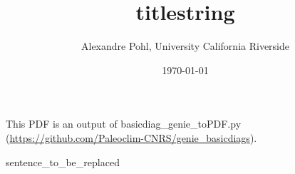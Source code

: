 \documentclass[a4paper,12pt]{scrartcl}
\begin{document}
\title{titlestring}
\author{Alexandre Pohl, University California Riverside}
\date{\today}
\maketitle

\listoffigures

\clearpage

This PDF is an output of basicdiag_genie_toPDF.py (\url{https://github.com/Paleoclim-CNRS/genie_basicdiags}). \\ 



\begin{flushleft}
sentence_to_be_replaced
\end{flushleft}

\clearpage

\end{document}

